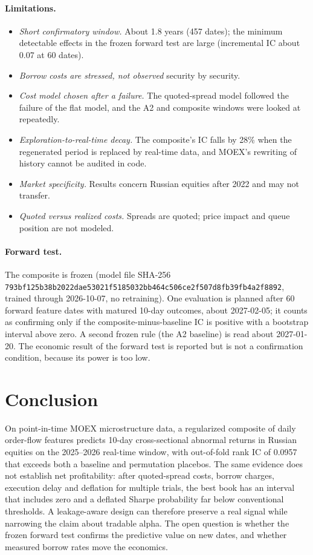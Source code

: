 \documentclass[11pt]{article}
\begin{document}
\paragraph{Limitations.}
\begin{itemize}
\item \emph{Short confirmatory window.} About 1.8 years (457 dates); the minimum detectable effects in the frozen forward test are large (incremental IC about 0.07 at 60 dates).
\item \emph{Borrow costs are stressed, not observed} security by security.
\item \emph{Cost model chosen after a failure.} The quoted-spread model followed the failure of the flat model, and the A2 and composite windows were looked at repeatedly.
\item \emph{Exploration-to-real-time decay.} The composite's IC falls by 28\% when the regenerated period is replaced by real-time data, and MOEX's rewriting of history cannot be audited in code.
\item \emph{Market specificity.} Results concern Russian equities after 2022 and may not transfer.
\item \emph{Quoted versus realized costs.} Spreads are quoted; price impact and queue position are not modeled.
\end{itemize}

\paragraph{Forward test.} The composite is frozen (model file SHA-256 \texttt{793bf125b38b2022dae53021f5185032bb464c506ce2f507d8fb39fb4a2f8892}, trained through 2026-10-07, no retraining). One evaluation is planned after 60 forward feature dates with matured 10-day outcomes, about 2027-02-05; it counts as confirming only if the composite-minus-baseline IC is positive with a bootstrap interval above zero. A second frozen rule (the A2 baseline) is read about 2027-01-20. The economic result of the forward test is reported but is not a confirmation condition, because its power is too low.

\section{Conclusion}

On point-in-time MOEX microstructure data, a regularized composite of daily order-flow features predicts 10-day cross-sectional abnormal returns in Russian equities on the 2025--2026 real-time window, with out-of-fold rank IC of 0.0957 that exceeds both a baseline and permutation placebos. The same evidence does not establish net profitability: after quoted-spread costs, borrow charges, execution delay and deflation for multiple trials, the best book has an interval that includes zero and a deflated Sharpe probability far below conventional thresholds. A leakage-aware design can therefore preserve a real signal while narrowing the claim about tradable alpha. The open question is whether the frozen forward test confirms the predictive value on new dates, and whether measured borrow rates move the economics.
\end{document}
